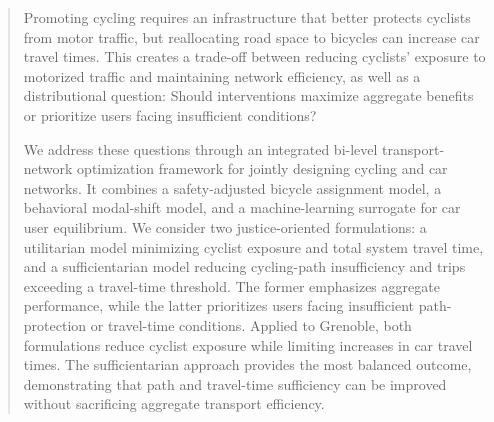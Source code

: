 \documentclass[lettersize,journal]{IEEEtran}
\begin{document}
\begin{abstract}

Promoting cycling requires an infrastructure that better protects cyclists from motor traffic, but reallocating road space to bicycles can increase car travel times. This creates a trade-off between reducing cyclists' exposure to motorized traffic and maintaining network efficiency, as well as a distributional question: Should interventions maximize aggregate benefits or prioritize users facing insufficient conditions?

We address these questions through an integrated bi-level transport-network optimization framework for jointly designing cycling and car networks. It combines a safety-adjusted bicycle assignment model, a behavioral modal-shift model, and a machine-learning surrogate for car user equilibrium. We consider two justice-oriented formulations: a utilitarian model minimizing cyclist exposure and total system travel time, and a sufficientarian model reducing cycling-path insufficiency and trips exceeding a travel-time threshold. The former emphasizes aggregate performance, while the latter prioritizes users facing insufficient path-protection or travel-time conditions. Applied to Grenoble, both formulations reduce cyclist exposure while limiting increases in car travel times. The sufficientarian approach provides the most balanced outcome, demonstrating that path and travel-time sufficiency can be improved without sacrificing aggregate transport efficiency.



\end{abstract}
\end{document}
